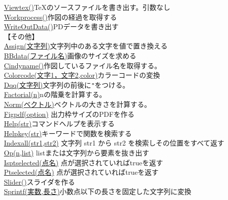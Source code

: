 \documentclass[papersize,a4paper,12pt,uplatex]{jsarticle}
\begin{document}
\begin{tabbing}
\hyperlink{viewtex}{Viewtex()}\>\TeX のソースファイルを書き出す。引数なし\\
\hyperlink{workprocess}{Workprocess()}\>作図の経過を取得する\\
\hyperlink{writeoutdata}{WriteOutData()}\>PDデータを書き出す\\
\vspace{\baselineskip}
【その他】\\
\hyperlink{assign}{Assign(文字列)}\>文字列中のある文字を値で置き換える\\
\hyperlink{bbdata}{BBdata(ファイル名)}\>画像のサイズを求める\\
\hyperlink{cindyname}{Cindyname()}\>作図しているファイル名を取得する。\\
\hyperlink{colorcode}{Colorcode(文字1，文字2,color)}\>カラーコードの変換\\
\hyperlink{dqq}{Dqq(文字列)}\>文字列の前後に\verb|"|をつける。\\
\hyperlink{factorial}{Factorial(n)}\>nの階乗を計算する。\\
\hyperlink{norm}{Norm(ベクトル)}\>ベクトルの大きさを計算する。\\
\hyperlink{figpdf}{Figpdf(option)} \>出力枠サイズのPDFを作る\\
\hyperlink{help}{Help(str)}\>コマンドヘルプを表示する\\
\hyperlink{helpkey}{Helpkey(str)}\>キーワードで関数を検索する\\
\hyperlink{indexall}{Indexall(str1,str2)} \>文字列 str1 から str2 を検索しその位置をすべて返す\\
\hyperlink{op}{Op(n,list)} \> listまたは文字列から要素を抜き出す\\
\hyperlink{isptselected}{Isptselected(点名)} \>点が選択されていればtrueを返す\\
\hyperlink{isptselected}{Ptselected(点名)} \>点が選択されていればtrueを返す\\
\hyperlink{slider}{Slider()}\>スライダを作る\\
\hyperlink{sprintf}{Sprintf(実数,長さ)}\>小数点以下の長さを固定した文字列に変換\\

\end{tabbing}
\end{document}
